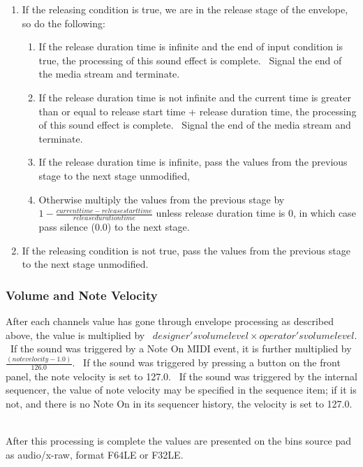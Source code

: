 \documentclass[letterpaper]{article}
\newcommand\liststyleLxii{%
\renewcommand\theenumi{\arabic{enumi}}
\renewcommand\theenumii{\alph{enumii}}
\renewcommand\labelenumi{ \theenumi.}
\renewcommand\labelenumii{ \theenumii)}
\renewcommand\labelitemi{•}
\renewcommand\labelitemii{•}
}
\begin{document}
\liststyleLxii
\begin{enumerate}
\item If the releasing condition is true, we are in the release stage of
the envelope, so do the following:

\begin{enumerate}
\item If the release duration time is infinite and the end of input
condition is true, the processing of this sound effect is complete.
\ Signal the end of the media stream and terminate.
\item If the release duration time is not infinite and the current time
is greater than or equal to release start time + release duration time,
the processing of this sound effect is complete. \ Signal the end of
the media stream and terminate.
\item If the release duration time is infinite, pass the values from the
previous stage to the next stage unmodified,
\item Otherwise multiply the values from the previous stage by
$1-\frac{\mathit{current}\mathit{time}-\mathit{release}\mathit{start}\mathit{time}}{\mathit{release}\mathit{duration}\mathit{time}}$
unless release duration time is 0, in which case pass silence (0.0) to
the next stage.
\end{enumerate}
\item If the releasing condition is not true, pass the values from the
previous stage to the next stage unmodified.
\end{enumerate}
\subsubsection[Volume and Note Velocity]{Volume and Note Velocity}
After each channel{\textquotesingle}s value has gone through envelope
processing as described above, the value is multiplied by \ 
$\mathit{designer}'s\mathit{volume}\mathit{level}\times
{\mathit{operator}'s\mathit{volume}\mathit{level}}$. \ If the sound was
triggered by a Note On MIDI event, it is further multiplied by 
$\frac{(\mathit{note}\mathit{velocity}-1.0)}{126.0}$. \ If the sound
was triggered by pressing a button on the front panel, the note
velocity is set to 127.0. \ If the sound was triggered by the internal
sequencer, the value of note velocity may be specified in the sequence
item; if it is not, and there is no Note On in its sequencer history,
the velocity is set to 127.0. \ 

After this processing is complete the values are presented on the
bin{\textquotesingle}s source pad as audio/x-raw, format F64LE or
F32LE.
\end{document}
